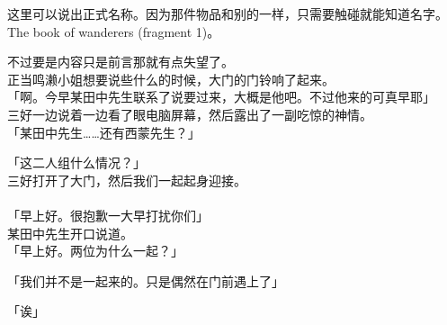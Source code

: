 这里可以说出正式名称。因为那件物品和别的一样，只需要触碰就能知道名字。The book of wanderers (fragment 1)。

不过要是内容只是前言那就有点失望了。\\

正当鸣濑小姐想要说些什么的时候，大门的门铃响了起来。\\

「啊。今早某田中先生联系了说要过来，大概是他吧。不过他来的可真早耶」\\

三好一边说着一边看了眼电脑屏幕，然后露出了一副吃惊的神情。\\

「某田中先生……还有西蒙先生？」

「这二人组什么情况？」\\

三好打开了大门，然后我们一起起身迎接。\\

\sqsplit\\

「早上好。很抱歉一大早打扰你们」\\

某田中先生开口说道。\\

「早上好。两位为什么一起？」

「我们并不是一起来的。只是偶然在门前遇上了」

「诶」\\

